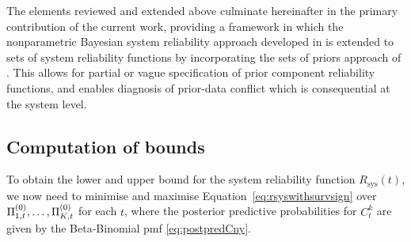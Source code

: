 \documentclass[12pt, a4paper]{elsarticle}
\newcommand{\Rsys}{R_\text{sys}}
\begin{document}
The elements reviewed and extended above culminate hereinafter in the primary contribution of the current work,
providing a framework in which the nonparametric Bayesian system reliability approach developed in \cite{2015:bayessurvsign}
is extended to sets of system reliability functions
by incorporating the sets of priors approach of \citet{2009:WalterAugustin}.
This allows for partial or vague specification of prior component reliability functions,
and enables diagnosis of prior-data conflict which is consequential at the system level.

\subsection{Computation of bounds}

To obtain the lower and upper bound for the system reliability function $\Rsys(t)$,
we now need to minimise and maximise Equation~\eqref{eq:rsyswithsurvsign} over $\Pi^{(0)}_{1,t}, \ldots, \Pi^{(0)}_{K,t}$ for each $t$,
where the posterior predictive probabilities for $C^k_t$ are given by the Beta-Binomial pmf \eqref{eq:postpredCny}.
%
\end{document}
